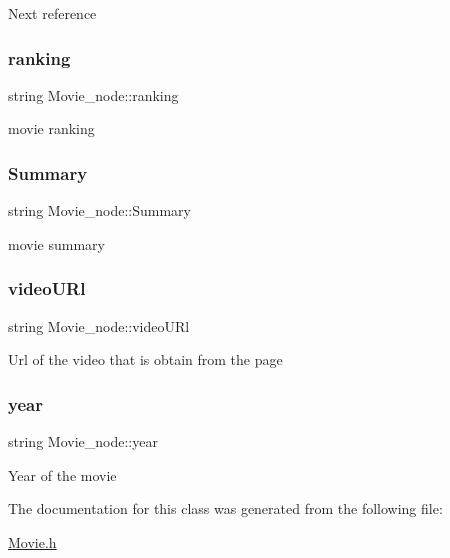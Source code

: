 Next reference \mbox{\label{classMovie__node_a2aea339243aca3a9a58cb7354b77843f}} 
\subsubsection{\texorpdfstring{ranking}{ranking}}
{\footnotesize\ttfamily string Movie\+\_\+node\+::ranking}

movie ranking \mbox{\label{classMovie__node_a8371338af1be6c6f6d39999f69f0f919}} 
\subsubsection{\texorpdfstring{Summary}{Summary}}
{\footnotesize\ttfamily string Movie\+\_\+node\+::\+Summary}

movie summary \mbox{\label{classMovie__node_a7a230db668bcc7c4a33af83d49b31e7f}} 
\subsubsection{\texorpdfstring{video\+U\+Rl}{videoURl}}
{\footnotesize\ttfamily string Movie\+\_\+node\+::video\+U\+Rl}

Url of the video that is obtain from the page \mbox{\label{classMovie__node_a0dd5efdccfdad17e92ec23f407d939c4}} 
\subsubsection{\texorpdfstring{year}{year}}
{\footnotesize\ttfamily string Movie\+\_\+node\+::year}

Year of the movie 

The documentation for this class was generated from the following file\+:\begin{DoxyCompactItemize}
\item 
\hyperlink{Movie_8h}{Movie.\+h}\end{DoxyCompactItemize}
